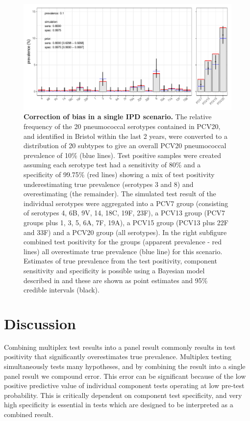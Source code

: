 \documentclass[10pt,letterpaper]{article}
\begin{document}
\begin{figure}[h!]
\centerline{\includegraphics{fig/simulation_result_bayes.pdf}}
\caption{{\bf Correction of bias in a single IPD scenario.}
The relative frequency of the 20 pneumococcal serotypes contained in PCV20, and identified in Bristol within the last 2 years, were converted to a distribution of 20 subtypes to give an overall PCV20 pneumococcal prevalence of 10\% (blue lines). Test positive samples were created assuming each serotype test had a sensitivity of 80\% and a specificity of 99.75\% (red lines) showing a mix of test positivity underestimating true prevalence (serotypes 3 and 8) and overestimating (the remainder). The simulated test result of the individual serotypes were aggregated into a PCV7 group (consisting of serotypes 4, 6B, 9V, 14, 18C, 19F, 23F), a PCV13 group (PCV7 groups plus 1, 3, 5, 6A, 7F, 19A), a PCV15 group (PCV13 plus 22F and 33F) and a PCV20 group (all serotypes). In the right subfigure combined test positivity for the groups (apparent prevalence - red lines) all overestimate true prevalence (blue line) for this scenario. Estimates of true prevalence from the test positivity, component sensitivity and specificity is possible using a Bayesian model described in  and these are shown as point estimates and 95\% credible intervals (black).}
\label{fig5}
\end{figure}

\section*{Discussion}

Combining multiplex test results into a panel result commonly results in test positivity that significantly overestimates true prevalence. Multiplex testing simultaneously tests many hypotheses, and by combining the result into a single panel result we compound error. This error can be significant because of the low positive predictive value of individual component tests operating at low pre-test probability. This is critically dependent on component test specificity, and very high specificity is essential in tests which are designed to be interpreted as a combined result.
\end{document}
